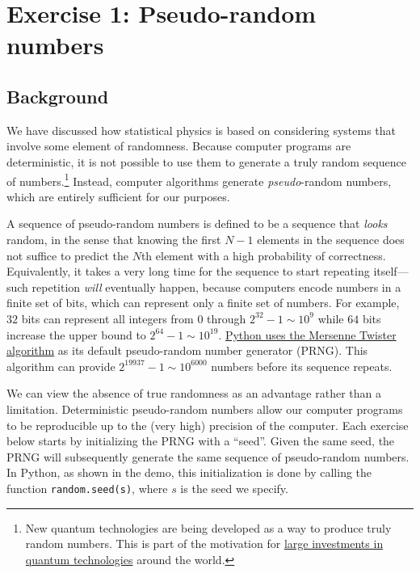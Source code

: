 \documentclass[12 pt]{article} %
\begin{document}
\section*{Exercise 1: Pseudo-random numbers}
\subsection*{Background}
We have discussed how statistical physics is based on considering systems that involve some element of randomness.
Because computer programs are deterministic, it is not possible to use them to generate a truly random sequence of numbers.\footnote{New quantum technologies are being developed as a way to produce truly random numbers.  This is part of the motivation for \href{https://uknqt.ukri.org}{large investments in quantum technologies} around the world.}
Instead, computer algorithms generate \textit{pseudo}-random numbers, which are entirely sufficient for our purposes.

A sequence of pseudo-random numbers is defined to be a sequence that \textit{looks} random, in the sense that knowing the first $N - 1$ elements in the sequence does not suffice to predict the $N$th element with a high probability of correctness.
Equivalently, it takes a very long time for the sequence to start repeating itself---such repetition \textit{will} eventually happen, because computers encode numbers in a finite set of bits, which can represent only a finite set of numbers.
For example, $32$ bits can represent all integers from $0$ through \href{https://en.wikipedia.org/wiki/4,294,967,295}{$2^{32} - 1 \sim 10^9$} while $64$ bits increase the upper bound to $2^{64} - 1 \sim 10^{19}$.
\href{https://docs.python.org/3/library/random.html}{Python uses the Mersenne Twister algorithm} as its default pseudo-random number generator (PRNG).
This algorithm can provide $2^{19937} - 1 \sim 10^{6000}$ numbers before its sequence repeats.

We can view the absence of true randomness as an advantage rather than a limitation.
Deterministic pseudo-random numbers allow our computer programs to be reproducible up to the (very high) precision of the computer.
Each exercise below starts by initializing the PRNG with a ``seed''.
Given the same seed, the PRNG will subsequently generate the same sequence of pseudo-random numbers.
In Python, as shown in the demo, this initialization is done by calling the function \texttt{random.seed(s)}, where $s$ is the seed we specify.
\end{document}
